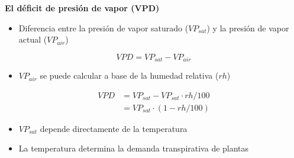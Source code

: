 \documentclass[usepdftitle=false]{beamer}
\newcommand{\Rar}{$\Rightarrow$}
\begin{document}
\begin{frame}
\begin{block}{\textbf{El déficit de presión de vapor (VPD)}}
	\begin{itemize}
	 \item<1-> Diferencia entre la presión de vapor saturado ($VP_{sat}$) y la presión de vapor actual ($VP_{air}$)
	 \end{itemize}
	 
	 	\vspace{-1em}
	 	\begin{equation*}
	 	VPD = VP_{sat} - VP_{air}
	 	\end{equation*}
	 	
		\vspace{-1em}
   	\begin{itemize}
	 \item $VP_{air}$ se puede calcular a base de la humedad relativa ($rh$)
	 \end{itemize}
	 
	\vspace{-2em}	
	\begin{align*}
		VPD &= VP_{sat}  - VP_{sat} \cdot rh/100 \\
		    &= VP_{sat} \cdot (1 - rh/100) 
	\end{align*}
	
	\vspace{-1em}
	\begin{itemize}
		\item<2-> $VP_{sat}$ depende directamente de la temperatura
		\item<visible@3>[\Rar] \alert{La temperatura determina la demanda transpirativa de plantas}
	\end{itemize}
\end{block}
\end{frame}


\end{document}
